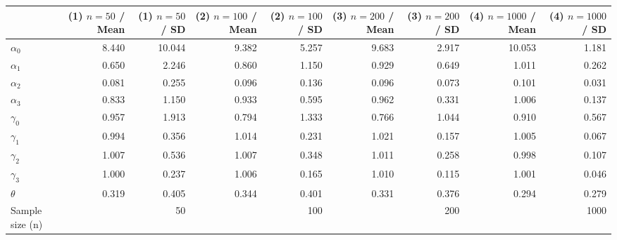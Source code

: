 
\begin{tabular}[t]{lrrrrrrrr}
\toprule
  & (1) $n=50$ / Mean & (1) $n=50$ / SD & (2) $n=100$ / Mean & (2) $n=100$ / SD & (3) $n=200$ / Mean & (3) $n=200$ / SD & (4) $n=1000$ / Mean & (4) $n=1000$ / SD\\
\midrule
$\alpha_{0}$ & 8.440 & 10.044 & 9.382 & 5.257 & 9.683 & 2.917 & 10.053 & 1.181\\
$\alpha_{1}$ & 0.650 & 2.246 & 0.860 & 1.150 & 0.929 & 0.649 & 1.011 & 0.262\\
$\alpha_{2}$ & 0.081 & 0.255 & 0.096 & 0.136 & 0.096 & 0.073 & 0.101 & 0.031\\
$\alpha_{3}$ & 0.833 & 1.150 & 0.933 & 0.595 & 0.962 & 0.331 & 1.006 & 0.137\\
$\gamma_{0}$ & 0.957 & 1.913 & 0.794 & 1.333 & 0.766 & 1.044 & 0.910 & 0.567\\
$\gamma_{1}$ & 0.994 & 0.356 & 1.014 & 0.231 & 1.021 & 0.157 & 1.005 & 0.067\\
$\gamma_{2}$ & 1.007 & 0.536 & 1.007 & 0.348 & 1.011 & 0.258 & 0.998 & 0.107\\
$\gamma_{3}$ & 1.000 & 0.237 & 1.006 & 0.165 & 1.010 & 0.115 & 1.001 & 0.046\\
$\theta$ & 0.319 & 0.405 & 0.344 & 0.401 & 0.331 & 0.376 & 0.294 & 0.279\\
Sample size (n) &  & 50 &  & 100 &  & 200 &  & 1000\\
\bottomrule
\end{tabular}
